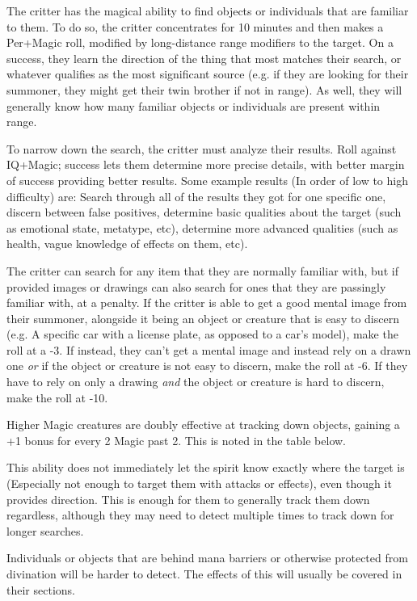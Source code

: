 \begin{multicols*}{3}
	The critter has the magical ability to find objects or individuals that are familiar to them. To do so, the critter concentrates for 10 minutes and then makes a Per+Magic roll, modified by long-distance range modifiers to the target. On a success, they learn the direction of the thing that most matches their search, or whatever qualifies as the most significant source (e.g. if they are looking for their summoner, they might get their twin brother if not in range). As well, they will generally know how many familiar objects or individuals are present within range. 
	
	To narrow down the search, the critter must analyze their results. Roll against IQ+Magic; success lets them determine more precise details, with better margin of success providing better results. Some example results (In order of low to high difficulty) are: Search through all of the results they got for one specific one, discern between false positives, determine basic qualities about the target (such as emotional state, metatype, etc), determine more advanced qualities (such as health, vague knowledge of effects on them, etc).
	
	The critter can search for any item that they are normally familiar with, but if provided images or drawings can also search for ones that they are passingly familiar with, at a penalty. If the critter is able to get a good mental image from their summoner, alongside it being an object or creature that is easy to discern (e.g. A specific car with a license plate, as opposed to a car's model), make the roll at a -3. If instead, they can't get a mental image and instead rely on a drawn one \textit{or} if the object or creature is not easy to discern, make the roll at -6. If they have to rely on only a drawing \textit{and} the object or creature is hard to discern, make the roll at -10.
	
	Higher Magic creatures are doubly effective at tracking down objects, gaining a +1 bonus for every 2 Magic past 2. This is noted in the table below.
	
	This ability does not immediately let the spirit know exactly where the target is (Especially not enough to target them with attacks or effects), even though it provides direction. This is enough for them to generally track them down regardless, although they may need to detect multiple times to track down for longer searches.
	
	Individuals or objects that are behind mana barriers or otherwise protected from divination will be harder to detect. The effects of this will usually be covered in their sections. 
	

\end{multicols*}
